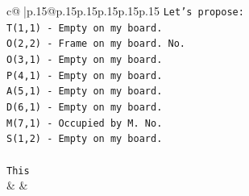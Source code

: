 \documentclass{article}
\begin{document}
{\begin{supertabular}{c@{$\;$}|p{.15\linewidth}@{}p{.15\linewidth}p{.15\linewidth}p{.15\linewidth}p{.15\linewidth}p{.15\linewidth}}
{{{\texttt{Let's propose:} \\
\texttt{T(1,1) {-} Empty on my board.} \\
\texttt{O(2,2) {-} Frame on my board. No.} \\
\texttt{O(3,1) {-} Empty on my board.} \\
\texttt{P(4,1) {-} Empty on my board.} \\
\texttt{A(5,1) {-} Empty on my board.} \\
\texttt{D(6,1) {-} Empty on my board.} \\
\texttt{M(7,1) {-} Occupied by M. No.} \\
\texttt{S(1,2) {-} Empty on my board.} \\
\\ 
\texttt{This} \\
            }
        }
    }
    & & \\ \\


\end{supertabular}}
\end{document}
